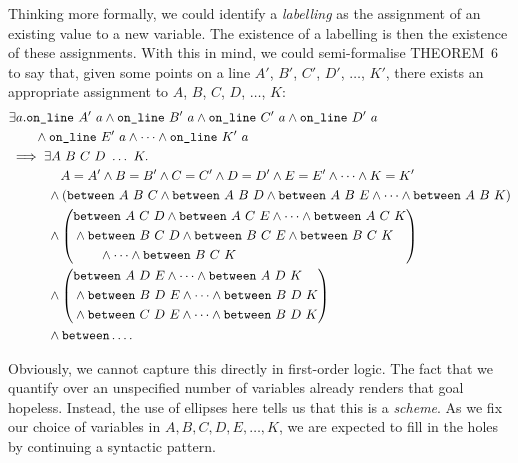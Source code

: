 Thinking more formally, we could identify a \emph{labelling} as the assignment of an existing value to a new variable. The existence of a labelling is then the existence of these assignments. With this in mind, we could semi-formalise THEOREM~6 to say that, given some points on a line $A'$, $B'$, $C'$, $D'$, $\ldots$, $K'$, there exists an appropriate assignment to $A$, $B$, $C$, $D$, $\ldots$, $K$:
\begin{equation*}
  \begin{split}
    &\exists a. \code{on\_line}\ A'\ a\wedge\code{on\_line}\ B'\ a\wedge\code{on\_line}\ C'\ a\wedge\code{on\_line}\ D'\ a\\
    &\qquad\wedge\code{on\_line}\ E'\ a\wedge\cdots\wedge\code{on\_line}\ K'\ a\\
    &\implies\exists A\ B\ C\ D\ \ldots\ K. \\
    &\qquad\qquad A = A' \wedge B = B' \wedge C = C' \wedge D = D' \wedge E = E' \wedge \cdots \wedge K = K'\\
    &\qquad\quad\wedge\left(\between{A}{B}{C} \wedge \between{A}{B}{D} \wedge \between{A}{B}{E} \wedge \cdots \wedge \between{A}{B}{K}\right) \\
    &\qquad\quad\wedge
    \left(\begin{split}&\between{A}{C}{D} \wedge \between{A}{C}{E} \wedge \cdots \wedge \between{A}{C}{K}\\
        &\wedge\between{B}{C}{D} \wedge \between{B}{C}{E} \wedge \between{B}{C}{K}\\
        &\qquad\wedge \cdots \wedge \between{B}{C}{K}
      \end{split}\right)\\  
    &\qquad\quad\wedge
    \left(\begin{split}&\between{A}{D}{E} \wedge \cdots \wedge \between{A}{D}{K} \\
        &\wedge\between{B}{D}{E} \wedge \cdots \wedge \between{B}{D}{K} \\
        &\wedge\between{C}{D}{E} \wedge \cdots \wedge \between{B}{D}{K}
        \end{split}\right)\\
    &\qquad\quad\wedge\code{between}\ldots.
  \end{split}
\end{equation*}

Obviously, we cannot capture this directly in first-order logic. The fact that we quantify over an unspecified number of variables already renders that goal hopeless. Instead, the use of ellipses here tells us that this is a \emph{scheme}. As we fix our choice of variables in $A, B, C, D, E, \ldots, K$, we are expected to fill in the holes by continuing a syntactic pattern.

